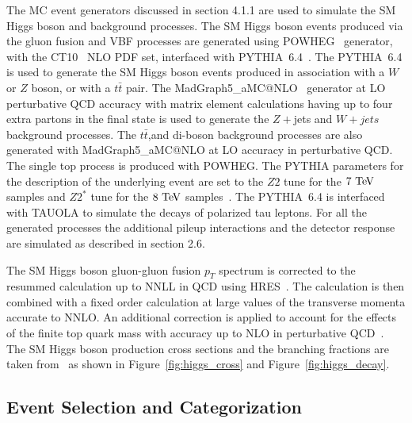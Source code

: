 The MC event generators discussed in section 4.1.1 are used to simulate the SM Higgs boson and background processes. The SM Higgs boson events produced via the gluon fusion and VBF processes are generated using POWHEG~\cite{POWHEG-V, POWHEG1, POWHEG2, POWHEG3} generator, with the CT10~\cite{Lai:2010vv} NLO PDF set, interfaced with PYTHIA~6.4~\cite{Sjostrand:2006za}. The PYTHIA~6.4 is used to generate the SM Higgs boson events produced in association with a $W$ or $Z$ boson, or with a $t\bar{t}$ pair. The MadGraph5\_aMC@NLO~\cite{Alwall:2007st} generator at LO perturbative QCD accuracy with matrix element calculations having up to four extra partons in the final state is used to generate the $Z+$jets and $W+jets$ background processes. The $t\bar{t}$,and di-boson background processes are also generated with MadGraph5\_aMC@NLO at LO accuracy in perturbative QCD. The single top process is produced with POWHEG. The PYTHIA parameters for the description of the underlying event are set to the $Z2$ tune for the $7~\mathrm{Te\kern -0.1em V}$ samples and $Z2^{*}$ tune for the $8~\mathrm{Te\kern -0.1em V}$ samples~\cite{CMS-PAS-FSQ-12-020}. The PYTHIA~6.4 is interfaced with TAUOLA to simulate the decays of polarized tau leptons. For all the generated processes the additional pileup interactions and the detector response are simulated as described in section 2.6. 

The SM Higgs boson gluon-gluon fusion $p_{T}$ spectrum is corrected to the resummed calculation up to NNLL in QCD using HRES~\cite{deFlorian:2012mx}. The calculation is then combined with a fixed order calculation at large values of the transverse momenta accurate to NNLO. An additional correction is applied to account for the effects of the finite top quark mass with accuracy up to NLO in perturbative QCD~\cite{Grazzini:2013mca}. The SM Higgs boson production cross sections and the branching fractions are taken from~\cite{Dittmaier:2011ti,Dittmaier:2012vm,Heinemeyer:2013tqa} as shown in Figure~\ref{fig:higgs_cross} and Figure~\ref{fig:higgs_decay}.

\subsection{Event Selection and Categorization}

